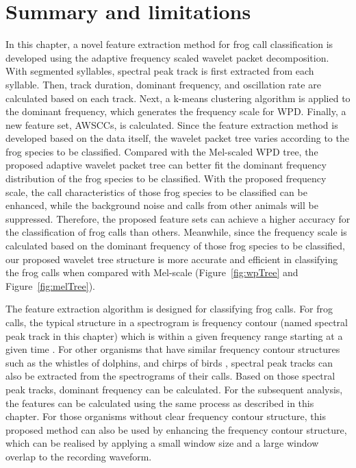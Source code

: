 \section{Summary and limitations}
In this chapter, a novel feature extraction method for frog call classification is developed using the adaptive frequency scaled wavelet packet decomposition. With segmented syllables, spectral peak track is first extracted from each syllable. Then, track duration, dominant frequency, and oscillation rate are calculated based on each track. Next, a k-means clustering algorithm is applied to the dominant frequency, which generates the frequency scale for WPD. Finally, a new feature set, AWSCCs, is calculated. Since the feature extraction method is developed based on the data itself, the wavelet packet tree varies according to the frog species to be classified. Compared with the Mel-scaled WPD tree, the proposed adaptive wavelet packet tree can better fit the dominant frequency distribution of the frog species to be classified. With the proposed frequency scale, the call characteristics of those frog species to be classified can be enhanced, while the background noise and calls from other animals will be suppressed. Therefore, the proposed feature sets can achieve a higher accuracy for the classification of frog calls than others. Meanwhile, since the frequency scale is calculated based on the dominant frequency of those frog species to be classified, our proposed wavelet tree structure is more accurate and efficient in classifying the frog calls when compared with Mel-scale (Figure~\ref{fig:wpTree} and Figure~\ref{fig:melTree}).


The feature extraction algorithm is designed for classifying frog calls. For frog calls, the typical structure in a spectrogram is frequency contour (named spectral peak track in this chapter) which is within a given frequency range starting at a given time \citep{mellinger2011method}. For other organisms that have similar frequency contour structures such as the whistles of dolphins, and chirps of birds \citep{chen2006semi}, spectral peak tracks can also be extracted from the spectrograms of their calls. Based on those spectral peak tracks, dominant frequency can be calculated. For the subsequent analysis, the features can be calculated using the same process as described in this chapter. For those organisms without clear frequency contour structure, this proposed method can also be used by enhancing the frequency contour structure, which can be realised by applying a small window size and a large window overlap to the recording waveform. 


